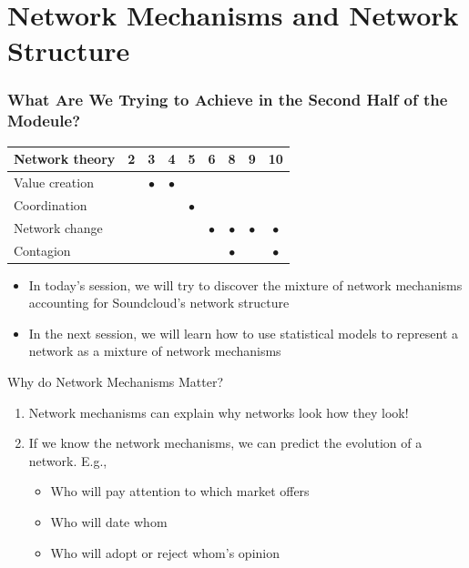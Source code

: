\documentclass[show notes, aspectratio=1610]{beamer}
\begin{document}

\section{Network Mechanisms and Network Structure}

\begin{frame}
	\frametitle{What Are We Trying to Achieve in the Second Half of the Modeule?}
	\begin{table}
		\begin{tabular}[c]{l|c|c|c|c|c|c|c|c}
			\textbf{Network theory} & 
			\textbf{2} & 
			\textbf{3} & 
			\textbf{4} & 
			\textbf{5} & 
			\textbf{6} & 
			\textbf{8} & 
			\textbf{9} & 
			\textbf{10}\\
			\hline
			Value creation &  & $\bullet$ & $\bullet$ &           &           &           &           & \\
			Coordination   &  &           &           & $\bullet$ &           &           &           & \\
			Network change &  &           &           &           & $\bullet$ & $\bullet$ & $\bullet$ & $\bullet$\\
			Contagion      &  &           &           &           &           & $\bullet$ &           & $\bullet$ \\
		\end{tabular}
	\end{table}

	\begin{itemize}
		\item In today's session, we will try to discover the 
		mixture of network 
		mechanisms accounting for Soundcloud's network structure
		\pause
		\item In the next session, we will learn how to use statistical 
      models to represent a network as a mixture of network mechanisms
  \end{itemize}
\end{frame}


\begin{frame}{Why do Network Mechanisms Matter?}{}
	\begin{enumerate}
		\item Network mechanisms can explain why networks look how 
		they look!
		\item If we know the network mechanisms, we can predict the
		evolution of a network. E.g.,
		\begin{itemize}
			\item 
			Who will pay attention to which market offers
			\item 
			Who will date whom
			\item 
			Who will adopt or reject whom's opinion
		\end{itemize}
	\end{enumerate}
\end{frame}
\end{document}
